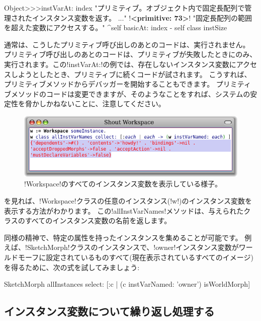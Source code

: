 \documentclass[a4paper,10pt,twoside]{book}
\begin{document}
\begin{code}{}
Object>>>instVarAt: index 
	"プリミティブ。オブジェクト内で固定長配列で管理されたインスタンス変数を返す。 ..."
	!\textbf{<primitive: 73>}!
	"固定長配列の範囲を超えた変数にアクセスする。"
	^self basicAt: index - self class instSize		
\end{code}

通常は、こうしたプリミティブ呼び出しのあとのコードは、実行されません。
プリミティブ呼び出しのあとのコードは、プリミティブが失敗したときにのみ、実行されます。この\ct!instVarAt:!の例では、存在しないインスタンス変数にアクセスしようとしたとき、プリミティブに続くコードが試されます。
こうすれば、プリミティブメソッドからデバッガーを開始することもできます。
プリミティブメソッドのコードは変更できますが、そのようなことをすれば、\pharo システムの安定性を脅かしかねないことに、注意してください。

\begin{figure}[ht]\centering
	\includegraphics[width=\linewidth]{allInstanceVariables}
	\caption{\ct!Workspace!のすべてのインスタンス変数を表示している様子。}
\end{figure}

を見れば、\ct!Workspace!クラスの任意のインスタンス(\ct!w!)のインスタンス変数を表示する方法がわかります。
この\ct!allInstVarNames!メソッドは、与えられたクラスのすべてのインスタンス変数の名前を返します。

同様の精神で、特定の属性を持ったインスタンスを集めることが可能です。
例えば、\ct!SketchMorph!クラスのインスタンスで、\ct!owner!インスタンス変数がワールドモーフに設定されているものすべて(\ie 現在表示されているすべてのイメージ)を得るために、次の式を試してみましょう:
\begin{code}{}
SketchMorph allInstances select: [:c | (c instVarNamed: 'owner') isWorldMorph]
\end{code}

\subsection{インスタンス変数について繰り返し処理する}
\end{document}

